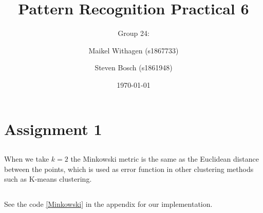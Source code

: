 \documentclass[10pt]{article}
\title{Pattern Recognition Practical 6}
\author{Group 24: \and Maikel Withagen (s1867733) \and Steven Bosch (s1861948)}
\date{\today}
\begin{document}
\maketitle

\section*{Assignment 1}
\subsection{}
When we take $k=2$ the Minkowski metric is the same as the Euclidean distance between the points, which is used as error function in other clustering methods such as K-means clustering.

\subsection{}
See the code \ref{Minkowski} in the appendix for our implementation.
\end{document}
